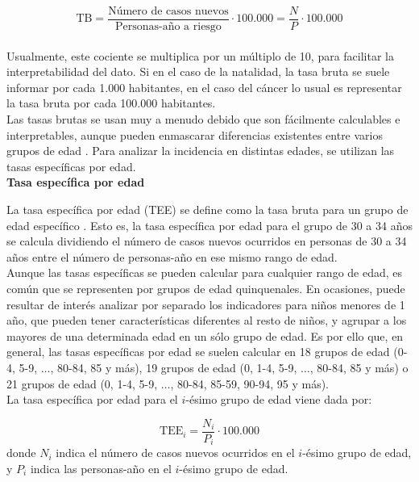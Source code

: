 $$\text{TB}  = \dfrac{\text{Número de casos nuevos}}{\text{Personas-año a riesgo}} \cdot 100.000 = \dfrac{N}{P} \cdot 100.000$$\\

\noindent Usualmente, este cociente se multiplica por un múltiplo de 10, para facilitar la interpretabilidad del dato. Si en el caso de la natalidad, la tasa bruta se suele informar por cada 1.000 habitantes, en el caso del cáncer lo usual es representar la tasa bruta por cada 100.000 habitantes.\\

\noindent Las tasas brutas se usan muy a menudo debido que son fácilmente calculables e interpretables, aunque pueden enmascarar diferencias existentes entre varios grupos de edad \cite{IARC1999}. Para analizar la incidencia en distintas edades, se utilizan las tasas específicas por edad.\\

\noindent \textbf{Tasa específica por edad}

\noindent La tasa específica por edad (TEE) se define como la tasa bruta para un grupo de edad específico \cite{IARC1995}. Esto es, la tasa específica por edad para el grupo de 30 a 34 años se calcula dividiendo el número de casos nuevos ocurridos en personas de 30 a 34 años entre el número de personas-año en ese mismo rango de edad.\\

\noindent Aunque las tasas específicas se pueden calcular para cualquier rango de edad, es común que se representen por grupos de edad quinquenales. En ocasiones, puede resultar de interés analizar por separado los indicadores para niños menores de 1 año, que pueden tener características diferentes al resto de niños, y agrupar a los mayores de una determinada edad en un sólo grupo de edad. Es por ello que, en general, las tasas específicas por edad se suelen calcular en 18 grupos de edad (0-4, 5-9, $\dots$, 80-84, 85 y más), 19 grupos de edad (0, 1-4, 5-9,  $\dots$, 80-84, 85 y más) o 21 grupos de edad (0, 1-4, 5-9,  $\dots$, 80-84, 85-59, 90-94, 95 y más).\\

\noindent La tasa específica por edad para el $i$-ésimo grupo de edad viene dada por:

$$\text{TEE}_i = \dfrac{N_i}{P_i} \cdot 100.000$$ donde $N_i$ indica el número de casos nuevos ocurridos en el $i$-ésimo grupo de edad, y $P_i$ indica las personas-año en el $i$-ésimo grupo de edad.\\

